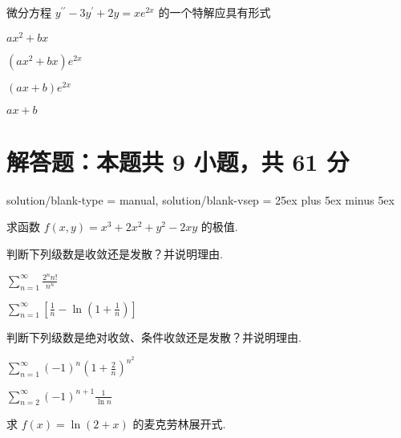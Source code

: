 \begin{question}[points = 3]
    微分方程 $y^{\prime\prime} - 3y^{\prime} + 2y = xe^{2x}$ 的一个特解应具有形式 \paren[]
\end{question}
\begin{choices}
    \item $ax^2 + bx$
    \item $(ax^2 + bx)e^{2x}$
    \item $(ax + b)e^{2x}$
    \item $ax + b$
\end{choices}

\section{解答题：本题共 9 小题，共 61 分}
\examsetup
{
    solution/blank-type = manual,
    solution/blank-vsep = 25ex plus 5ex minus 5ex
}

\begin{problem}[points = 8]
求函数 $f(x, y) = x^3 + 2x^2 + y^2 -2xy$ 的极值.
\end{problem}

\begin{problem}[points = 8]
判断下列级数是收敛还是发散？并说明理由.
\end{problem}
\begin{calculations}[columns = 2, label = (\arabic*)]
    \item $\sum\limits_{n = 1}^{\infty} \frac{2^nn!}{n^n}$
    \item $\sum\limits_{n = 1}^{\infty} \left[\frac{1}{n} - \ln{\left(1 + \frac{1}{n}\right)}\right]$
\end{calculations}

\begin{problem}[points = 8]
判断下列级数是绝对收敛、条件收敛还是发散？并说明理由.
\end{problem}
\begin{calculations}[columns = 2, label = (\arabic*)]
    \item $\sum\limits_{n = 1}^{\infty} (-1)^n\left(1 + \frac{2}{n}\right)^{n^2}$
    \item $\sum\limits_{n = 2}^{\infty} (-1)^{n + 1}\frac{1}{\ln{n}}$
\end{calculations}

\begin{problem}[points = 8]
求 $f(x) = \ln{(2 + x)}$ 的麦克劳林展开式.
\end{problem}

